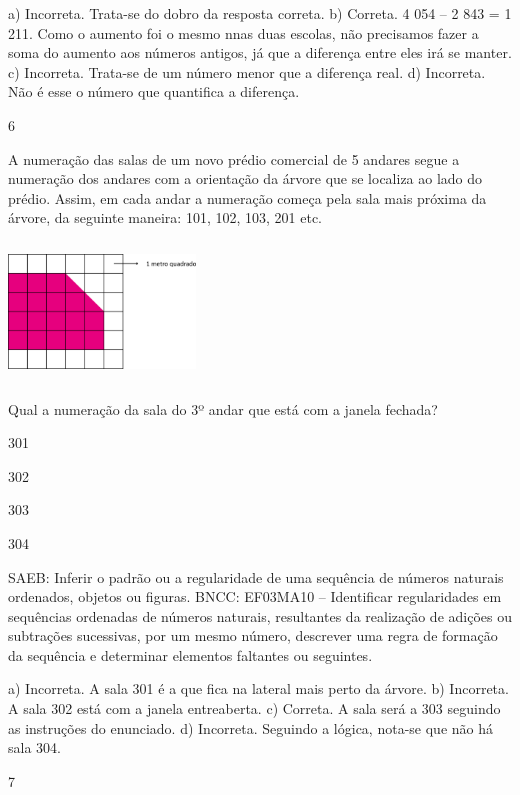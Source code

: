 \begin{escolha}
{\begin{escolha}
{a) Incorreta. Trata-se do dobro da resposta correta.
b) Correta. 4 054 -- 2 843 = 1 211. Como o aumento foi o mesmo nnas duas escolas, não
precisamos fazer a soma do aumento aos números antigos, já que a diferença entre eles irá se manter.
c) Incorreta. Trata-se de um número menor que a diferença real.
d) Incorreta. Não é esse o número que quantifica a diferença.

\num{6}

A numeração das salas de um novo prédio comercial de 5 andares segue a
numeração dos andares com a orientação da árvore que se localiza ao
lado do prédio. Assim, em cada andar a numeração começa pela sala mais
próxima da árvore, da seguinte maneira: 101, 102, 103, 201 etc.


\includegraphics[width=1.96154in,height=1.44792in]{media/image108.png}

Qual a numeração da sala do 3º andar que está com a janela fechada?

\begin{escolha}
\item
  301
\item
  302
\item
  303
\item
  304
\end{escolha}

SAEB: Inferir o padrão ou a regularidade de uma sequência de
números naturais ordenados, objetos ou figuras.
BNCC: EF03MA10 -- Identificar regularidades em sequências ordenadas de números naturais,
resultantes da realização de adições ou subtrações sucessivas, por um mesmo número,
descrever uma regra de formação da sequência e determinar elementos faltantes ou seguintes.

a) Incorreta. A sala 301 é a que fica na lateral mais perto da árvore.
b) Incorreta. A sala 302 está com a janela entreaberta.
c) Correta. A sala será a 303 seguindo as instruções do enunciado.
d) Incorreta. Seguindo a lógica, nota-se que não há sala 304.

\num{7}

}
\end{escolha}}
\end{escolha}
